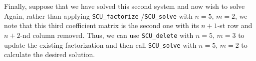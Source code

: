 \documentclass{galahad}
\newcommand{\packagename}{SCU}
\begin{document}
Finally, suppose that we have solved this second system and now wish
to solve
Again, rather than applying {\tt \packagename\_factorize} /{\tt \packagename\_solve}
with $n = 5$, $m = 2$, we note
that this third coefficient matrix is the second one with its
$n + 1$-st row and $n + 2$-nd column removed. Thus, we can use
{\tt \packagename\_delete} with $n = 5$, $m = 3$ to update the existing factorization
and then call
{\tt \packagename\_solve} with $n = 5$, $m = 2$ to calculate the desired solution.
\end{document}

